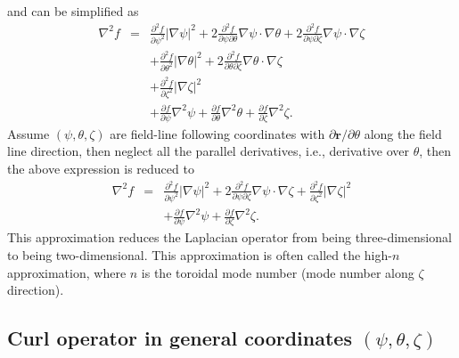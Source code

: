 \documentclass{llncs}
\begin{document}
and can be simplified as
\begin{eqnarray}
  \nabla^2 f & = & \frac{\partial^2 f}{\partial \psi^2} | \nabla \psi |^2 + 2
  \frac{\partial^2 f}{\partial \psi \partial \theta} \nabla \psi \cdot \nabla
  \theta + 2 \frac{\partial^2 f}{\partial \psi \partial \zeta} \nabla \psi
  \cdot \nabla \zeta \nonumber\\
  &  & + \frac{\partial^2 f}{\partial \theta^2} | \nabla \theta |^2 + 2
  \frac{\partial^2 f}{\partial \theta \partial \zeta} \nabla \theta \cdot
  \nabla \zeta \nonumber\\
  &  & + \frac{\partial^2 f}{\partial \zeta^2} | \nabla \zeta |^2 \nonumber\\
  &  & + \frac{\partial f}{\partial \psi} \nabla^2 \psi + \frac{\partial
  f}{\partial \theta} \nabla^2 \theta + \frac{\partial f}{\partial \zeta}
  \nabla^2 \zeta . 
\end{eqnarray}
Assume $(\psi, \theta, \zeta)$ are field-line following coordinates with
$\partial \mathbf{r}/ \partial \theta$ along the field line direction, then
neglect all the parallel derivatives, i.e., derivative over $\theta$, then the
above expression is reduced to
\begin{eqnarray}
  \nabla^2 f & = & \frac{\partial^2 f}{\partial \psi^2} | \nabla \psi |^2 + 2
  \frac{\partial^2 f}{\partial \psi \partial \zeta} \nabla \psi \cdot \nabla
  \zeta + \frac{\partial^2 f}{\partial \zeta^2} | \nabla \zeta |^2 \nonumber\\
  &  & + \frac{\partial f}{\partial \psi} \nabla^2 \psi + \frac{\partial
  f}{\partial \zeta} \nabla^2 \zeta . 
\end{eqnarray}
This approximation reduces the Laplacian operator from being three-dimensional
to being two-dimensional. This approximation is often called the high-$n$
approximation, where $n$ is the toroidal mode number (mode number along
$\zeta$ direction).

\subsection{Curl operator in general coordinates $(\psi, \theta, \zeta)$}
\end{document}

